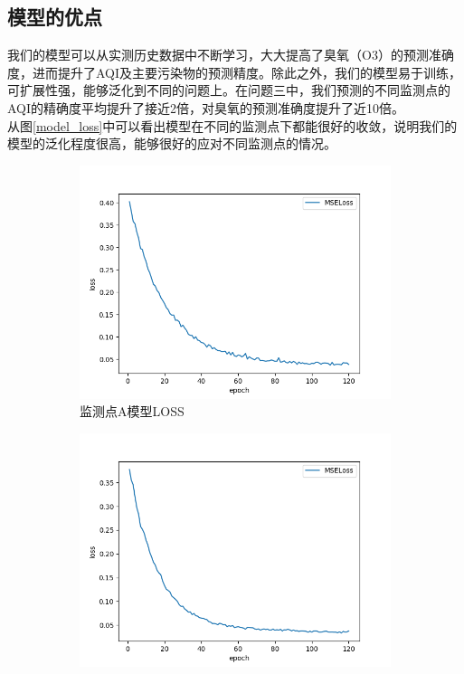 \documentclass[bwprint]{gmcmthesis}
\numberwithin{figure}{section}
\begin{document}
\subsection{模型的优点}
我们的模型可以从实测历史数据中不断学习，大大提高了臭氧（O3）的预测准确度，进而提升了AQI及主要污染物的预测精度。除此之外，我们的模型易于训练，可扩展性强，能够泛化到不同的问题上。在问题三中，我们预测的不同监测点的AQI的精确度平均提升了接近2倍，对臭氧的预测准确度提升了近10倍。\\
从图\ref{model_loss}中可以看出模型在不同的监测点下都能很好的收敛，说明我们的模型的泛化程度很高，能够很好的应对不同监测点的情况。
\begin{figure}
	\centering
	\begin{subfigure}[ht]{.3\textwidth}
		\centering
		\includegraphics[width=\textwidth]{figures/model_loss.png}
		\caption{监测点A模型LOSS}
		\label{A_model_loss}
	\end{subfigure}
	\begin{subfigure}[ht]{.3\textwidth}
		\centering
		\includegraphics[width=\textwidth]{figures/model_loss_B.png}

\end{subfigure}
\end{figure}
\end{document}
